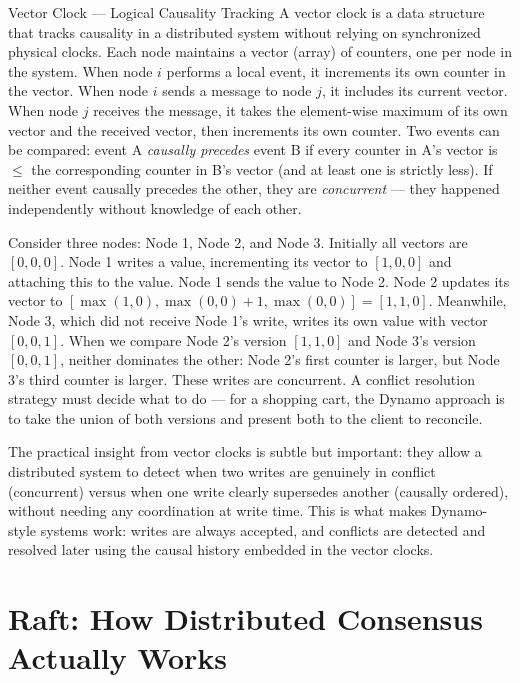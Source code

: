 \documentclass[11pt,a4paper]{article}
\begin{document}
\begin{termbox}{Vector Clock --- Logical Causality Tracking}
A vector clock is a data structure that tracks causality in a distributed system without relying on synchronized physical clocks. Each node maintains a vector (array) of counters, one per node in the system. When node $i$ performs a local event, it increments its own counter in the vector. When node $i$ sends a message to node $j$, it includes its current vector. When node $j$ receives the message, it takes the element-wise maximum of its own vector and the received vector, then increments its own counter. Two events can be compared: event A \textit{causally precedes} event B if every counter in A's vector is $\leq$ the corresponding counter in B's vector (and at least one is strictly less). If neither event causally precedes the other, they are \textit{concurrent} --- they happened independently without knowledge of each other.
\end{termbox}

Consider three nodes: Node 1, Node 2, and Node 3. Initially all vectors are $[0, 0, 0]$. Node 1 writes a value, incrementing its vector to $[1, 0, 0]$ and attaching this to the value. Node 1 sends the value to Node 2. Node 2 updates its vector to $[\max(1,0), \max(0,0)+1, \max(0,0)] = [1, 1, 0]$. Meanwhile, Node 3, which did not receive Node 1's write, writes its own value with vector $[0, 0, 1]$. When we compare Node 2's version $[1, 1, 0]$ and Node 3's version $[0, 0, 1]$, neither dominates the other: Node 2's first counter is larger, but Node 3's third counter is larger. These writes are concurrent. A conflict resolution strategy must decide what to do --- for a shopping cart, the Dynamo approach is to take the union of both versions and present both to the client to reconcile.

The practical insight from vector clocks is subtle but important: they allow a distributed system to detect when two writes are genuinely in conflict (concurrent) versus when one write clearly supersedes another (causally ordered), without needing any coordination at write time. This is what makes Dynamo-style systems work: writes are always accepted, and conflicts are detected and resolved later using the causal history embedded in the vector clocks.

\section{Raft: How Distributed Consensus Actually Works}
\end{document}
